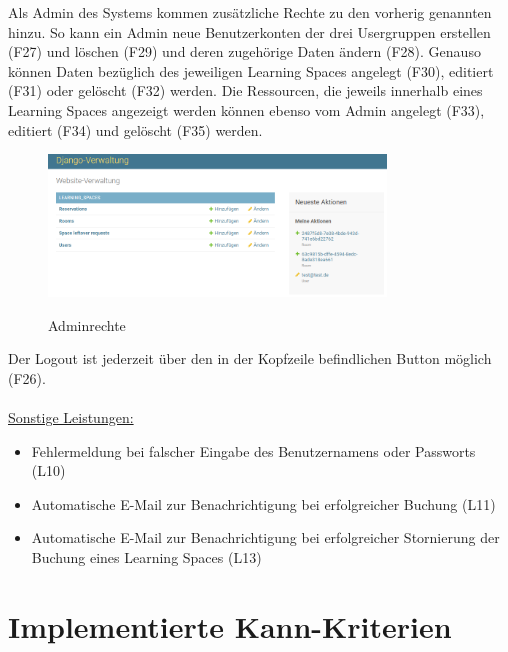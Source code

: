 \documentclass[a4paper,report,headsepline]{scrreprt}
\begin{document}
Als Admin des Systems kommen zusätzliche Rechte zu den vorherig genannten hinzu. So kann ein Admin neue Benutzerkonten der drei Usergruppen erstellen (F27) und löschen (F29) und deren zugehörige Daten ändern (F28). Genauso können Daten bezüglich des jeweiligen Learning Spaces angelegt (F30), editiert (F31) oder gelöscht (F32) werden. Die Ressourcen, die jeweils innerhalb eines Learning Spaces angezeigt werden können ebenso vom Admin angelegt (F33), editiert (F34) und gelöscht (F35) werden.
\clearpage
\begin{figure}[h]
    \centering
    \caption{Adminrechte}
    \includegraphics[width=0.8\textwidth]{Adminrechte}
    \label{fig:Adminrechte}
\end{figure}
Der Logout ist jederzeit über den in der Kopfzeile befindlichen Button möglich (F26).\\ \\
\underline{{\large Sonstige Leistungen:}}
\begin{itemize}

\item Fehlermeldung bei falscher Eingabe des Benutzernamens oder Passworts (L10)\\
\item Automatische E-Mail zur Benachrichtigung bei erfolgreicher Buchung (L11)\\
\item Automatische E-Mail zur Benachrichtigung bei erfolgreicher Stornierung der Buchung eines Learning Spaces (L13)
\end{itemize}
\section{Implementierte Kann-Kriterien}
\end{document}
